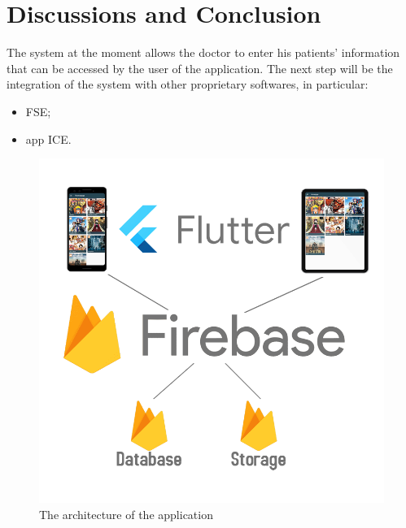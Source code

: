\documentclass[oneside]{book}
\begin{document}
\chapter{Discussions and Conclusion}
The system at the moment allows the doctor to enter his patients' information that can be accessed by the user of the application. The next step will be the integration of the system with other proprietary softwares, in particular:
\begin{itemize}
\item FSE;
\item app ICE.
\end{itemize}
\begin{figure}[H]
\centering
\includegraphics[scale = 0.3]{architecture}
\caption{The architecture of the application}
\end{figure}
\end{document}
